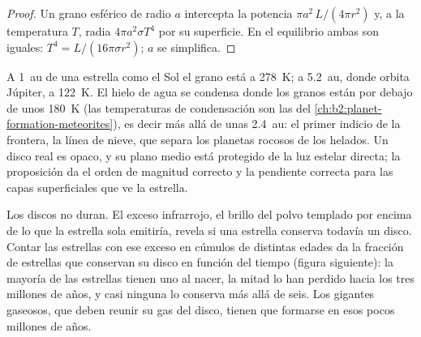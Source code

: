 \begin{proof}
Un grano esférico de radio $a$ intercepta la potencia $\pi a^2\,L/(4\pi r^2)$
y, a la temperatura $T$, radia $4\pi a^2\sigma T^4$ por su superficie.
En el equilibrio ambas son iguales: $T^4 = L/(16\pi\sigma r^2)$; $a$ se simplifica.
\end{proof}

A \qty{1}{au} de una estrella como el Sol el grano está a \qty{278}{K}; a
\qty{5.2}{au}, donde orbita Júpiter, a \qty{122}{K}. El hielo de agua se condensa donde
los granos están por debajo de unos \qty{180}{K} (las temperaturas de condensación son
las del \cref{ch:b2:planet-formation-meteorites}), es decir más allá de unas
\qty{2.4}{au}: el primer indicio de la frontera, la línea de nieve, que separa los
planetas rocosos de los helados. Un disco real es opaco, y su plano medio está protegido de la luz estelar directa; la
proposición da el orden de magnitud correcto y la pendiente correcta para las
capas superficiales que ve la estrella.

Los discos no duran. El exceso infrarrojo, el brillo del polvo templado por encima de lo que la estrella
sola emitiría, revela si una estrella conserva todavía un disco. Contar las estrellas
con ese exceso en cúmulos de distintas edades da la fracción de estrellas
que conservan su disco en función del tiempo (figura siguiente): la mayoría de las estrellas tienen uno
al nacer, la mitad lo han perdido hacia los tres millones de años, y casi ninguna
lo conserva más allá de seis. Los gigantes gaseosos, que deben reunir su gas del disco,
tienen que formarse en esos pocos millones de años.

